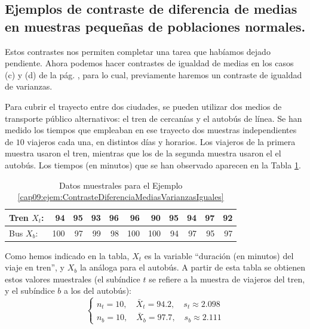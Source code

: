 \subsection{Ejemplos de contraste de diferencia de medias en muestras pequeñas de poblaciones normales.}
\label{cap09:subsec:EjemplosContrasteDiferenciaMediasUsandoT}

Estos contrastes nos permiten completar una tarea que habíamos dejado pendiente. Ahora podemos hacer contrastes de igualdad de medias en los casos (c) y (d) de la pág. \pageref{cap09:lugar:ContrasteDiferenciaMediasVarianzasIguales}, para lo cual,
previamente haremos un contraste de igualdad de varianzas.



\begin{ejemplo}
\label{cap09:ejem:ContrasteDiferenciaMediasVarianzasIguales}
Para cubrir el trayecto entre dos ciudades, se pueden utilizar dos medios de transporte público alternativos: el tren de cercanías y el autobús de línea. Se han medido los tiempos que empleaban en ese trayecto dos muestras independientes de $10$ viajeros cada una, en distintos días y horarios. Los viajeros de la primera muestra usaron el tren, mientras que los de la segunda muestra usaron el el autobús. Los tiempos (en minutos) que se han observado aparecen en la Tabla \ref{cap09:tabla:ejemploContrasteDiferneciaMediasVarianzasIguales}.
\begin{table}[ht]
\centering
\begin{tabular}{|l|rrrrrrrrrr|}
  \hline
  Tren $X_t$: & 94 & 95 & 93 & 96 & 96 & 90 & 95 & 94 & 97 & 92 \\
  \hline
  Bus $X_b$: & 100 & 97 & 99 & 98 & 100 & 100 & 94 & 97 & 95 & 97 \\
   \hline
\end{tabular}
\caption{Datos muestrales para el Ejemplo \ref{cap09:ejem:ContrasteDiferenciaMediasVarianzasIguales}}
\label{cap09:tabla:ejemploContrasteDiferneciaMediasVarianzasIguales}
\end{table}

Como hemos indicado en la tabla, $X_t$ es la variable ``duración (en minutos) del viaje en tren'', y $X_b$ la análoga para el autobús. A partir de esta tabla se obtienen estos valores muestrales (el subíndice $t$ se refiere a la muestra de viajeros del tren, y el subíndice $b$ a los del autobús):
\[
\begin{cases}
n_t=10,\quad \bar X_t=94.2,\quad s_t\approx 2.098\\[3mm]
n_b=10,\quad \bar X_b=97.7,\quad s_b\approx 2.111
\end{cases}
\]


\end{ejemplo}
